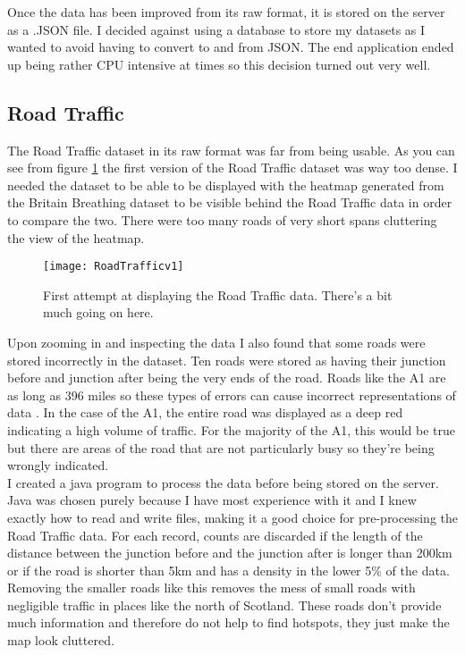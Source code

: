 Once the data has been improved from its raw format, it is stored on the server as a .JSON file. I decided against using a database to store my datasets as I wanted to avoid having to convert to and from JSON. The end application ended up being rather CPU intensive at times so this decision turned out very well.

\subsection{Road Traffic}

The Road Traffic dataset in its raw format was far from being usable. As you can see from figure \ref{fig:rt} the first version of the Road Traffic dataset was way too dense. I needed the dataset to be able to be displayed with the heatmap generated from the Britain Breathing dataset to be visible behind the Road Traffic data in order to compare the two. There were too many roads of very short spans cluttering the view of the heatmap.\\

\begin{figure}[H]
\begin{center}
\texttt{[image: RoadTrafficv1]}
\caption{First attempt at displaying the Road Traffic data. There's a bit much going on here.}
\label{fig:rt}
\end{center}
\end{figure}

Upon zooming in and inspecting the data I also found that some roads were stored incorrectly in the dataset. Ten roads were stored as having their junction before and junction after being the very ends of the road. Roads like the A1 are as long as 396 miles so these types of errors can cause incorrect representations of data \cite{longestRoad}. In the case of the A1, the entire road was displayed as a deep red indicating a high volume of traffic. For the majority of the A1, this would be true but there are areas of the road that are not particularly busy so they're being wrongly indicated.\\

I created a java program to process the data before being stored on the server. Java was chosen purely because I have most experience with it and I knew exactly how to read and write files, making it a good choice for pre-processing the Road Traffic data. For each record, counts are discarded if the length of the distance between the junction before and the junction after is longer than 200km or if the road is shorter than 5km and has a density in the lower 5\% of the data. Removing the smaller roads like this removes the mess of small roads with negligible traffic in places like the north of Scotland. These roads don't provide much information and therefore do not help to find hotspots, they just make the map look cluttered.\\

